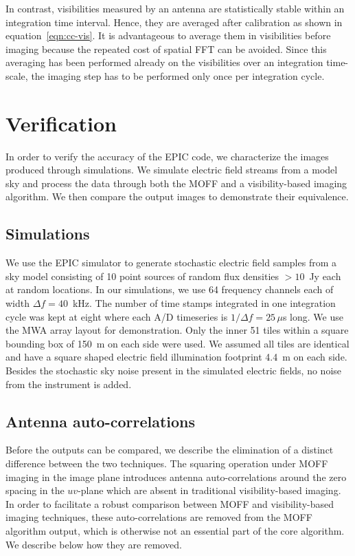 \documentclass[a4paper,fleqn,usenatbib]{mnras}
\begin{document}
In contrast, visibilities measured by an antenna are statistically stable within an integration time interval. Hence, they are averaged after calibration as shown in equation~\ref{eqn:cc-vis}. It is advantageous to average them in visibilities before imaging because the repeated cost of spatial FFT can be avoided. Since this averaging has been performed already on the visibilities over an integration time-scale, the imaging step has to be performed only once per integration cycle. 

\section{Verification}\label{sec:verify}

In order to verify the accuracy of the EPIC code, we characterize the images produced through simulations. We simulate electric field streams from a model sky and process the data through both the MOFF and a visibility-based imaging algorithm. We then compare the output images to demonstrate their equivalence.

\subsection{Simulations}\label{sec:sim}

We use the EPIC simulator to generate stochastic electric field samples from a sky model consisting of 10 point sources of random flux densities $>10$~Jy each at random locations. In our simulations, we use 64 frequency channels each of width $\Delta f = 40$~kHz. The number of time stamps integrated in one integration cycle was kept at eight where each A/D timeseries is $1/\Delta f=25\,\mu$s long. We use the MWA array layout \citep{bea12} for demonstration. Only the inner 51 tiles within a square bounding box of 150~m on each side were used. We assumed all tiles are identical and have a square shaped electric field illumination footprint 4.4~m on each side. Besides the stochastic sky noise present in the simulated electric fields, no noise from the instrument is added.

\subsection{Antenna auto-correlations}\label{sec:rm-autocorr}

Before the outputs can be compared, we describe the elimination of a distinct difference between the two techniques. The squaring operation under MOFF imaging in the image plane introduces antenna auto-correlations around the zero spacing in the $uv$-plane which are absent in traditional visibility-based imaging. In order to facilitate a robust comparison between MOFF and visibility-based imaging techniques, these auto-correlations are removed from the MOFF algorithm output, which is otherwise not an essential part of the core algorithm. We describe below how they are removed. 
\end{document}
